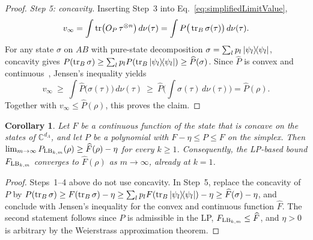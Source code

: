 \documentclass[aps,pra,twocolumn,showpacs,superscriptaddress,groupedaddress]{revtex4-2}
\newcommand{\C}{\mathds{C}}
\newtheorem{cor}    {Corollary}
\begin{document}
\begin{widetext}
\begin{proof}
    \emph{Step 5: concavity.} Inserting Step~3 into Eq.~\eqref{eq:simplifiedLimitValue},
    \begin{equation}
        v_\infty=\int\tr\!\big(O_P\,\tau^{\otimes n}\big)\,d\nu(\tau)=\int P\big(\tr_B\sigma(\tau)\big)\,d\nu(\tau).
    \end{equation}
    For any state $\sigma$ on $AB$ with pure-state decomposition $\sigma=\sum_l p_l\dyad{\psi_l}$, concavity gives $P(\tr_B\sigma)\geq\sum_lp_lP(\tr_B\dyad{\psi_l})\geq\widehat P(\sigma)$. Since $\widehat P$ is convex and continuous~\cite{Uhlmann2010Roofs}, Jensen's inequality yields
    \begin{equation}
        v_\infty\ \geq\ \int\widehat P\big(\sigma(\tau)\big)\,d\nu(\tau)\ \geq\ \widehat P\Big(\int\sigma(\tau)\,d\nu(\tau)\Big)=\widehat P(\rho).
    \end{equation}
    Together with $v_\infty\leq\widehat P(\rho)$, this proves the claim.
    \end{proof}

    \begin{cor}\label{cor:concaveTarget}
    Let $F$ be a continuous function of the state that is concave on the states of $\C^{d_A}$, and let $P$ be a polynomial with $F-\eta\leq P\leq F$ on the simplex. Then $\lim_{m\to\infty}P_{{\rm LB}_{k,m}}(\rho)\geq\widehat F(\rho)-\eta$ for every $k\geq1$. Consequently, the LP-based bound $F_{{\rm LB}_{k,m}}$ converges to $\widehat F(\rho)$ as $m\to\infty$, already at $k=1$.
    \end{cor}

    \begin{proof}
    Steps~1--4 above do not use concavity. In Step~5, replace the concavity of $P$ by
    $P(\tr_B\sigma)\geq F(\tr_B\sigma)-\eta\geq\sum_lp_lF(\tr_B\dyad{\psi_l})-\eta\geq\widehat F(\sigma)-\eta$, and conclude with Jensen's inequality for the convex and continuous function $\widehat F$. The second statement follows since $P$ is admissible in the LP, $F_{{\rm LB}_{k,m}}\leq\widehat F$, and $\eta>0$ is arbitrary by the Weierstrass approximation theorem.
    \end{proof}


\end{widetext}
\end{document}
